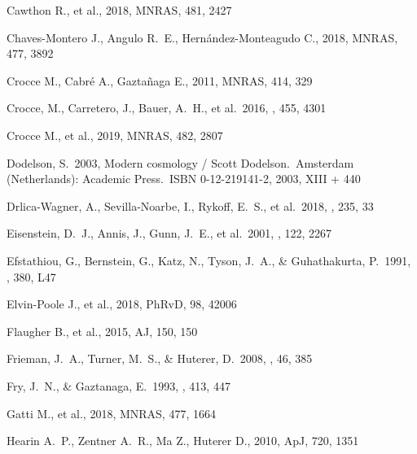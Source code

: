 \documentclass[a4paper,fleqn,usenatbib]{mnras}
\begin{document}
\begin{thebibliography}{99}
 Cawthon R., et al., 2018, MNRAS, 481, 2427

 Chaves-Montero J., Angulo R.~E., Hern{\'a}ndez-Monteagudo C., 2018, MNRAS, 477, 3892

 Crocce M., Cabr{\'e} A., Gazta{\~n}aga E., 2011, MNRAS, 414, 329

 Crocce, M., Carretero, J., Bauer, A.~H., et al.\ 2016, \mnras, 455, 4301

 Crocce M., et al., 2019, MNRAS, 482, 2807



 Dodelson, S.\ 2003, Modern cosmology / Scott Dodelson.~Amsterdam (Netherlands): Academic Press.~ISBN 0-12-219141-2, 2003, XIII + 440 

 Drlica-Wagner, A., Sevilla-Noarbe, I., Rykoff, E.~S., et al.\ 2018, \apjs, 235, 33 

 Eisenstein, D.~J., Annis, J., Gunn, J.~E., et al.\ 2001, \aj, 122, 2267 

 Efstathiou, G., Bernstein, G., Katz, N., Tyson, J.~A., \& Guhathakurta, P.\ 1991, \apjl, 380, L47 

 Elvin-Poole J., et al., 2018, PhRvD, 98, 42006

 Flaugher B., et al., 2015, AJ, 150, 150

 Frieman, J.~A., Turner, M.~S., \& Huterer, D.\ 2008, \araa, 46, 385

 Fry, J.~N., \& Gaztanaga, E.\ 1993, \apj, 413, 447

 Gatti M., et al., 2018, MNRAS, 477, 1664 

 Hearin A.~P., Zentner A.~R., Ma Z., Huterer D., 2010, ApJ, 720, 1351


\end{thebibliography}
\end{document}
